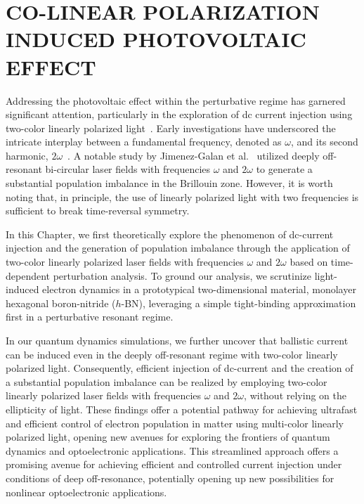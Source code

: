 \chapter{CO-LINEAR POLARIZATION INDUCED PHOTOVOLTAIC EFFECT} 
Addressing the photovoltaic effect within the perturbative regime has garnered significant attention, particularly in the exploration of dc current injection using two-color linearly polarized light~\cite{PhysRevLett.74.3596,PhysRevLett.76.1703,PhysRevLett.78.306,Sun2010,PhysRevB.100.075202,HeideBoolakeeEcksteinHommelhoff+2021+3701+3707,PhysRevLett.123.067402}. Early investigations have underscored the intricate interplay between a fundamental frequency, denoted as $\omega$, and its second harmonic, $2\omega$~\cite{PhysRevLett.74.3596,PhysRevLett.76.1703,PhysRevLett.78.306}. 
A notable study by Jimenez-Galan et al.~\cite{Jimenez-Galan2020} utilized deeply off-resonant bi-circular laser fields with frequencies $\omega$ and $2\omega$ to generate a substantial population imbalance in the Brillouin zone. However, it is worth noting that, in principle, the use of linearly polarized light with two frequencies is sufficient to break time-reversal symmetry.

In this Chapter, we first theoretically explore the phenomenon of dc-current injection and the generation of population imbalance through the application of two-color linearly polarized laser fields with frequencies $\omega$ and $2\omega$ based on time-dependent perturbation analysis. To ground our analysis, we scrutinize light-induced electron dynamics in a prototypical two-dimensional material, monolayer hexagonal boron-nitride ($h$-BN), leveraging a simple tight-binding approximation first in a perturbative resonant regime.

In our quantum dynamics simulations, we further uncover that ballistic current can be induced even in the deeply off-resonant regime with two-color linearly polarized light.  Consequently, efficient injection of dc-current and the creation of a substantial population imbalance can be realized by employing two-color linearly polarized laser fields with frequencies $\omega$ and $2\omega$, without relying on the ellipticity of light. These findings offer a potential pathway for achieving ultrafast and efficient control of electron population in matter using multi-color linearly polarized light, opening new avenues for exploring the frontiers of quantum dynamics and optoelectronic applications. This streamlined approach offers a promising avenue for achieving efficient and controlled current injection under conditions of deep off-resonance, potentially opening up new possibilities for nonlinear optoelectronic applications.

